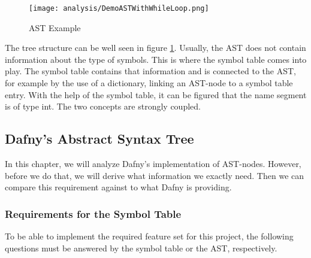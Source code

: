 \begin{figure}[H]
    \centering
    \texttt{[image: analysis/DemoASTWithWhileLoop.png]}
    \caption{AST Example}
    \label{fig:ast_for_example}
\end{figure}

The tree structure can be well seen in figure \ref{fig:ast_for_example}.
Usually, the AST does not contain information about the type of symbols.
This is where the symbol table comes into play.
The symbol table contains that information and is connected to the AST, for example by the use of a dictionary, linking an AST-node to a symbol table entry.
With the help of the symbol table, it can be figured that the name segment  is of type int.
The two concepts are strongly coupled.

\subsection{Dafny's Abstract Syntax Tree}
In this chapter, we will analyze Dafny's implementation of AST-nodes.
However, before we do that, we will derive what information we exactly need.
Then we can compare this requirement against to what Dafny is providing.

\subsubsection{Requirements for the Symbol Table}
To be able to implement the required feature set for this project, the following questions must be answered by the symbol table or the AST, respectively.

